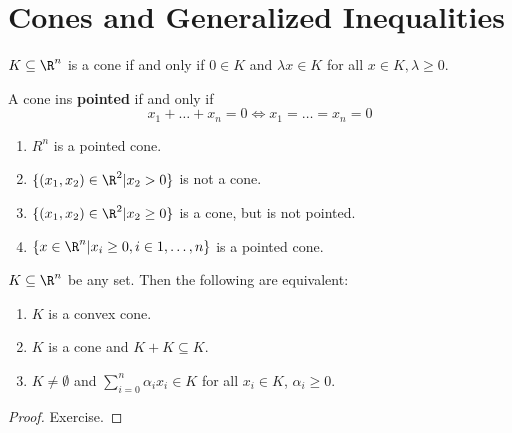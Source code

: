 \chapter{Cones and Generalized Inequalities}
\label{cha:cones-gener-ineq}

\begin{defn}
  \label{defn:cones_and_generalized_inequalities:1}
  $K \subseteq \R^{n}$ is a cone if and only if $0 \in K$ and $\lambda x
  \in K$ for all $x \in K, \lambda \geq 0$.
\end{defn}

\begin{defn}
  \label{defn:cones_and_generalized_inequalities:1}
  A cone ins \textbf{pointed} if and only if
  \begin{equation}
    \label{eq:27}
     x_{1} + \dots + x_{n} = 0 \iff x_{1} = \dots = x_{n} = 0
  \end{equation}
\end{defn}

\begin{exmp}
  \label{defn:cones_and_generalized_inequalities:1}
  \begin{enumerate}
  \item $R^{n}$ is a pointed cone.
  \item $\{ (x_{1}, x_{2}) \in \R^{2} | x_{2} > 0 \}$ is not a cone.
  \item $\{ (x_{1}, x_{2}) \in \R^{2} | x_{2} \geq 0 \}$ is a cone,
    but is not pointed.
  \item $\{ x \in \R^{n} | x_{i} \geq 0, i \in 1, \dots, n \}$ is a
    pointed cone.
  \end{enumerate}
\end{exmp}

\begin{proposition}
  $K \subseteq \R^{n}$ be any set.  Then the following are equivalent:
  \begin{enumerate}
  \item $K$ is a convex cone.
  \item $K$ is a cone and $K + K \subseteq K$.
  \item $K \neq \emptyset$ and $\sum_{i=0}^{n} \alpha_{i} x_{i} \in K$
    for all $x_{i} \in K$, $\alpha_{i} \geq 0$.
  \end{enumerate}
\end{proposition}

\begin{proof}
  Exercise.
\end{proof}

